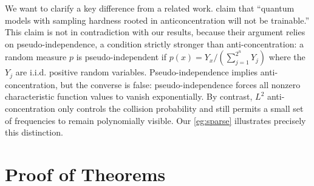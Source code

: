 \documentclass{article}
\theoremstyle{plain}
\theoremstyle{definition}
\theoremstyle{remark}
\begin{document}
We want to clarify a key difference from a related work. \citet{herbst25} claim that ``quantum models with sampling hardness rooted in anticoncentration will not be trainable.'' This claim is not in contradiction with our results, because their argument relies on pseudo-independence, a condition strictly stronger than anti-concentration: a random measure $p$ is pseudo-independent if $p(x)=Y_x / (\sum_{j=1}^{2^n} Y_j)$
where the $Y_j$ are i.i.d. positive random variables. Pseudo-independence implies anti-concentration, but the converse is false: pseudo-independence forces all nonzero characteristic function values to vanish exponentially. By contrast, $L^2$ anti-concentration only controls the collision probability and still permits a small set of frequencies to remain polynomially visible. Our \cref{eg:sparse} illustrates precisely this distinction. 







\appendix

\onecolumn
\section{Proof of Theorems}
\end{document}
